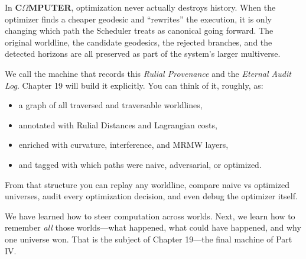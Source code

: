 In \textbf{C$\Omega$MPUTER}, optimization never actually destroys history. When the optimizer finds a cheaper geodesic and ``rewrites'' the execution, it is only changing which path the Scheduler treats as canonical going forward. The original worldline, the candidate geodesics, the rejected branches, and the detected horizons are all preserved as part of the system's larger multiverse.

We call the machine that records this \emph{Rulial Provenance} and the \emph{Eternal Audit Log}. Chapter 19 will build it explicitly. You can think of it, roughly, as:

\begin{itemize}
  \item a graph of all traversed and traversable worldlines,
  \item annotated with Rulial Distances and Lagrangian costs,
  \item enriched with curvature, interference, and MRMW layers,
  \item and tagged with which paths were naive, adversarial, or optimized.
\end{itemize}

From that structure you can replay any worldline, compare naive vs optimized universes, audit every optimization decision, and even debug the optimizer itself.

We have learned how to steer computation across worlds. Next, we learn how to remember \emph{all} those worlds—what happened, what could have happened, and why one universe won. That is the subject of Chapter 19—the final machine of Part IV.
